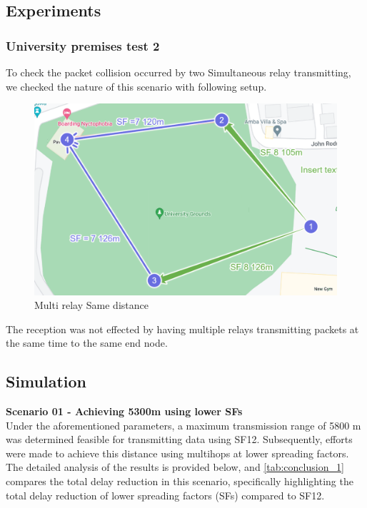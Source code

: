 \subsection{Experiments}
\label{sec:exp}

\subsubsection{University premises test 2}

To check the packet collision occurred by two Simultaneous relay transmitting, we checked the nature of this scenario with following setup.

\begin{figure}[ht!]
    \centering
    \includegraphics[width=0.8\linewidth]{images/Multirelays.png}
    \caption{Multi relay Same distance}
    \label{fig:single-hop-sim}
\end{figure}

The reception was not effected by having multiple relays transmitting packets at the same time to the same end node.


\subsection{Simulation}
\label{sec:sim}


\textbf{Scenario 01 - Achieving 5300m using lower SFs}\\

Under the aforementioned parameters, a maximum transmission range of 5800 m was determined feasible for transmitting data using SF12. Subsequently, efforts were made to achieve this distance using multihops at lower spreading factors. The detailed analysis of the results is provided below, and \autoref{tab:conclusion_1} compares the total delay reduction in this scenario, specifically highlighting the total delay reduction of lower spreading factors (SFs) compared to SF12.

